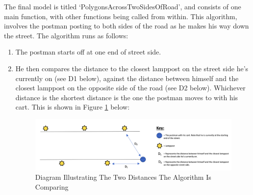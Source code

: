 \documentclass[14pt]{article}
\begin{document}
The final model is titled ‘PolygonsAcrossTwoSidesOfRoad’, and consists of one main function, with other functions being called from within. This algorithm, involves the postman posting to both sides of the road as he makes his way down the street. The algorithm runs as follows:

\begin{enumerate}
    \item The postman starts off at one end of street side.
    \item He then compares the distance to the closest lamppost on the street side he's currently on (see D1 below), against the distance between himself and the closest lamppost on the opposite side of the road (see D2 below). Whichever distance is the shortest distance is the one the postman moves to with his cart. This is shown in Figure \ref{fig:Diagram illustrating the two distances the algorithm is comparing} below:
    
    \begin{figure}[H]
    \centering
    \includegraphics[width = 430pt]{Images/DiagramIllustratingTheTwoDistancesTheAlgorithmIsComparing.png}
    \caption{Diagram Illustrating The Two Distances The Algorithm Is Comparing}
    \label{fig:Diagram illustrating the two distances the algorithm is comparing}
    \end{figure}


\end{enumerate}
\end{document}
